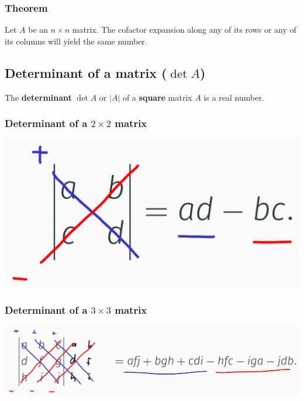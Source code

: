 \documentclass[11pt]{article}
\begin{document}
\subsubsection{Theorem}
\label{sec:orgfd63a65}
Let \(A\) be an \(n \times n\) matrix. The cofactor expansion along any of its rows or any of its columns will yield the same number.

\subsection{Determinant of a matrix (\(\det A\))}
\label{sec:orgd8327c3}
The \textbf{determinant} \(\det A\) or \(|A|\) of a \textbf{square} matrix \(A\) is a real number.

\subsubsection{Determinant of a \(2 \times 2\) matrix}
\label{sec:org9d0b8b0}
\begin{center}
\includegraphics[width=.9\linewidth]{./images/determinant-of-a-2-by-2-matrix.png}
\end{center}

\subsubsection{Determinant of a \(3 \times 3\) matrix}
\label{sec:org1230a70}
\begin{center}
\includegraphics[width=.9\linewidth]{./images/determinant-of-a-3-by-3-matrix.png}
\end{center}
\end{document}

